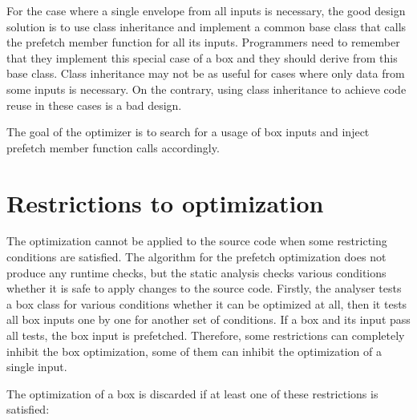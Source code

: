 For the case where a single envelope from all inputs is necessary, the good design solution is to use class inheritance and implement a common base class that calls the prefetch member function for all its inputs. Programmers need to remember that they implement this special case of a box and they should derive from this base class. Class inheritance may not be as useful for cases where only data from some inputs is necessary. On the contrary, using class inheritance to achieve code reuse in these cases is a bad design.

The goal of the optimizer is to search for a usage of box inputs and inject prefetch member function calls accordingly.

\section{Restrictions to optimization}
\label{prefetch-restrictions}
The optimization cannot be applied to the source code when some restricting conditions are satisfied. The algorithm for the prefetch optimization does not produce any runtime checks, but the static analysis checks various conditions whether it is safe to apply changes to the source code. Firstly, the analyser tests a box class for various conditions whether it can be optimized at all, then it tests all box inputs one by one for another set of conditions. If a box and its input pass all tests, the box input is prefetched. Therefore, some restrictions can completely inhibit the box optimization, some of them can inhibit the optimization of a single input.

The optimization of a box is discarded if at least one of these restrictions is satisfied:

